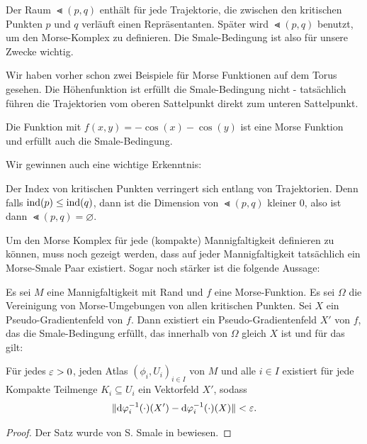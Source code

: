Der Raum $\Lt (p, q)$ enthält für jede Trajektorie, die zwischen den kritischen Punkten $p$ und $q$ 
verläuft einen Repräsentanten. Später wird $\Lt (p, q)$ benutzt, um den Morse-Komplex zu definieren.
Die Smale-Bedingung ist also für unsere Zwecke wichtig.

\begin{example}
    Wir haben vorher schon zwei Beispiele für Morse Funktionen auf dem Torus gesehen. 
    Die Höhenfunktion ist erfüllt die Smale-Bedingung nicht - tatsächlich führen die Trajektorien 
    vom oberen Sattelpunkt direkt zum unteren Sattelpunkt.

    Die Funktion mit $f(x, y) = - \cos(x) - \cos(y)$ ist eine Morse Funktion und erfüllt auch die 
    Smale-Bedingung.
\end{example}

Wir gewinnen auch eine wichtige Erkenntnis: 

\begin{corollary}
    Der Index von kritischen Punkten verringert sich entlang von Trajektorien. Denn falls 
    ${ \operatorname{ind} } (p) \leq { \operatorname{ind} } (q)$, dann ist die Dimension von $\Lt (p, q)$
    kleiner $0$, also ist dann $\Lt (p, q) = \varnothing$.
\end{corollary}

Um den Morse Komplex für jede (kompakte) Mannigfaltigkeit definieren zu können, muss noch gezeigt
werden, dass auf jeder Mannigfaltigkeit tatsächlich ein Morse-Smale Paar existiert. 
Sogar noch stärker ist die folgende Aussage:

\begin{theorem}
    Es sei $M$ eine Mannigfaltigkeit mit Rand und $f$ eine Morse-Funktion. Es sei $\Omega$ die 
    Vereinigung von Morse-Umgebungen von allen kritischen Punkten. Sei $X$ ein Pseudo-Gradientenfeld 
    von $f$. Dann existiert ein Pseudo-Gradientenfeld $X'$ von $f$, das die Smale-Bedingung erfüllt, 
    das innerhalb von $\Omega$ gleich $X$ ist und für das gilt:

    Für jedes $\varepsilon > 0$, jeden Atlas $(\phi_i, U_i)_{i \in I}$ von $M$ und alle $i \in I$ existiert 
    für jede Kompakte Teilmenge $K_i \subseteq U_i$ ein Vektorfeld $X'$, sodass 
    \[ \| { \operatorname{d} } \varphi_i^{-1} (\cdot) (X') - { \operatorname{d} } \varphi_i^{-1} (\cdot) (X) \| < \varepsilon . \]
\end{theorem}

\begin{proof}
    Der Satz wurde von S. Smale in \cite{smale1} bewiesen.
\end{proof}
